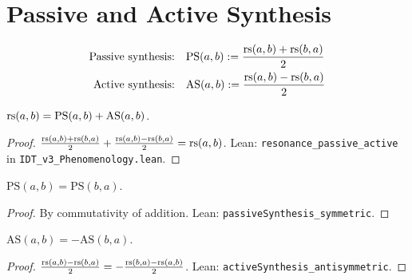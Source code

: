 \section{Passive and Active Synthesis}

\begin{definition}
\label{def:passive-active}
\begin{align}
\text{Passive synthesis:} &\quad \mathrm{PS}(a, b) := \frac{\mathrm{rs}(a,b) + \mathrm{rs}(b,a)}{2} \\
\text{Active synthesis:} &\quad \mathrm{AS}(a, b) := \frac{\mathrm{rs}(a,b) - \mathrm{rs}(b,a)}{2}
\end{align}
\end{definition}

\begin{theorem}
\label{thm:passive-active-decomp}
$\mathrm{rs}(a, b) = \mathrm{PS}(a, b) + \mathrm{AS}(a, b)$.
\end{theorem}

\begin{proof}
$\frac{\mathrm{rs}(a,b) + \mathrm{rs}(b,a)}{2} + \frac{\mathrm{rs}(a,b) - \mathrm{rs}(b,a)}{2} = \mathrm{rs}(a,b)$.
Lean: \texttt{resonance\_passive\_active} in \texttt{IDT\_v3\_Phenomenology.lean}.
\end{proof}

\begin{theorem}
\label{thm:passive-symmetric}
$\mathrm{PS}(a, b) = \mathrm{PS}(b, a)$.
\end{theorem}

\begin{proof}
By commutativity of addition.
Lean: \texttt{passiveSynthesis\_symmetric}.
\end{proof}

\begin{theorem}
\label{thm:active-antisymmetric}
$\mathrm{AS}(a, b) = -\mathrm{AS}(b, a)$.
\end{theorem}

\begin{proof}
$\frac{\mathrm{rs}(a,b) - \mathrm{rs}(b,a)}{2} = -\frac{\mathrm{rs}(b,a) - \mathrm{rs}(a,b)}{2}$.
Lean: \texttt{activeSynthesis\_antisymmetric}.
\end{proof}

